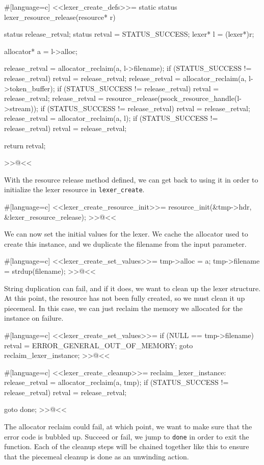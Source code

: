 {#[language=c]
<<lexer_create_defs>>=
static status lexer_resource_release(resource* r)
{
    status release_retval;
    status retval = STATUS_SUCCESS;
    lexer* l = (lexer*)r;

    allocator* a = l->alloc;

    release_retval = allocator_reclaim(a, l->filename);
    if (STATUS_SUCCESS != release_retval) retval = release_retval;
    release_retval = allocator_reclaim(a, l->token_buffer);
    if (STATUS_SUCCESS != release_retval) retval = release_retval;
    release_retval = resource_release(psock_resource_handle(l->stream));
    if (STATUS_SUCCESS != release_retval) retval = release_retval;
    release_retval = allocator_reclaim(a, l);
    if (STATUS_SUCCESS != release_retval) retval = release_retval;

    return retval;
}
>>@<<

With the resource release method defined, we can get back to using it in order
to initialize the lexer resource in \verb/lexer_create/.

#[language=c]
<<lexer_create_resource_init>>=
    resource_init(&tmp->hdr, &lexer_resource_release);
>>@<<

We can now set the initial values for the lexer. We cache the allocator used to
create this instance, and we duplicate the filename from the input parameter.

#[language=c]
<<lexer_create_set_values>>=
    tmp->alloc = a;
    tmp->filename = strdup(filename);
>>@<<

String duplication can fail, and if it does, we want to clean up the lexer
structure. At this point, the resource has not been fully created, so we must
clean it up piecemeal.  In this case, we can just reclaim the memory we
allocated for the instance on failure.

#[language=c]
<<lexer_create_set_values>>=
    if (NULL == tmp->filename)
    {
        retval = ERROR_GENERAL_OUT_OF_MEMORY;
        goto reclaim_lexer_instance;
    }
>>@<<

#[language=c]
<<lexer_create_cleanup>>=
reclaim_lexer_instance:
    release_retval = allocator_reclaim(a, tmp);
    if (STATUS_SUCCESS != release_retval)
    {
        retval = release_retval;
    }

    goto done;
>>@<<

The allocator reclaim could fail, at which point, we want to make sure that the
error code is bubbled up. Succeed or fail, we jump to \verb/done/ in order to
exit the function.  Each of the cleanup steps will be chained together like this
to ensure that the piecemeal cleanup is done as an unwinding action.

}
